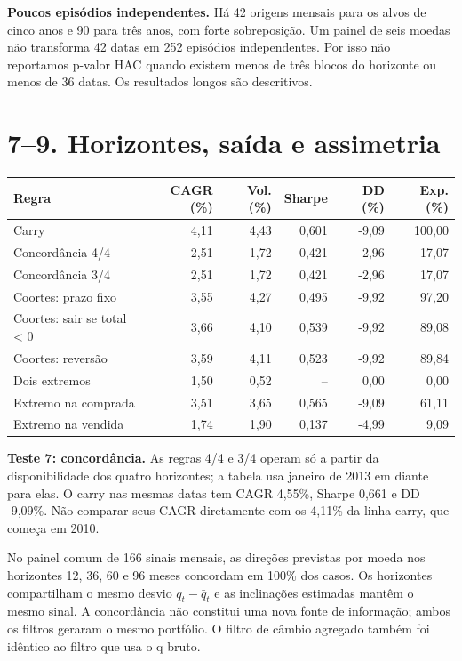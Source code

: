 \documentclass[11pt,a4paper]{article}
\begin{document}
\textbf{Poucos episódios independentes.} Há 42 origens mensais para os alvos de cinco anos e 90 para três anos, com forte sobreposição. Um painel de seis moedas não transforma 42 datas em 252 episódios independentes. Por isso não reportamos p-valor HAC quando existem menos de três blocos do horizonte ou menos de 36 datas. Os resultados longos são descritivos.

\clearpage
\section*{7--9. Horizontes, saída e assimetria}\small\begin{center}\begin{tabular}{lrrrrr}\toprule
Regra & CAGR (\%) & Vol. (\%) & Sharpe & DD (\%) & Exp. (\%) \\ \midrule
Carry & 4,11 & 4,43 & 0,601 & -9,09 & 100,00 \\
Concordância 4/4 & 2,51 & 1,72 & 0,421 & -2,96 & 17,07 \\
Concordância 3/4 & 2,51 & 1,72 & 0,421 & -2,96 & 17,07 \\
Coortes: prazo fixo & 3,55 & 4,27 & 0,495 & -9,92 & 97,20 \\
Coortes: sair se total < 0 & 3,66 & 4,10 & 0,539 & -9,92 & 89,08 \\
Coortes: reversão & 3,59 & 4,11 & 0,523 & -9,92 & 89,84 \\
Dois extremos & 1,50 & 0,52 & -- & 0,00 & 0,00 \\
Extremo na comprada & 3,51 & 3,65 & 0,565 & -9,09 & 61,11 \\
Extremo na vendida & 1,74 & 1,90 & 0,137 & -4,99 & 9,09 \\
\bottomrule\end{tabular}\end{center}\normalsize

\textbf{Teste 7: concordância.} As regras 4/4 e 3/4 operam só a partir da disponibilidade dos quatro horizontes; a tabela usa janeiro de 2013 em diante para elas. O carry nas mesmas datas tem CAGR 4,55\%, Sharpe 0,661 e DD -9,09\%. Não comparar seus CAGR diretamente com os 4,11\% da linha carry, que começa em 2010.

No painel comum de 166 sinais mensais, as direções previstas por moeda nos horizontes 12, 36, 60 e 96 meses concordam em 100\% dos casos. Os horizontes compartilham o mesmo desvio $q_t-\bar q_t$ e as inclinações estimadas mantêm o mesmo sinal. A concordância não constitui uma nova fonte de informação; ambos os filtros geraram o mesmo portfólio. O filtro de câmbio agregado também foi idêntico ao filtro que usa o q bruto.
\end{document}
